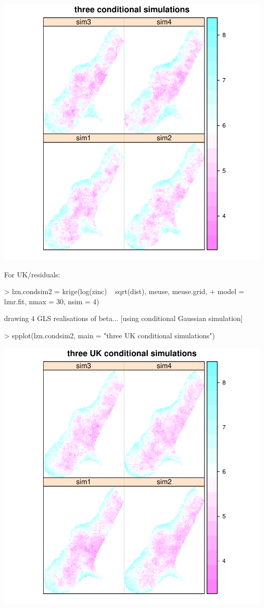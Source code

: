 \documentclass[a4paper]{article}
\begin{document}
\includegraphics{gstat-013}

For UK/residuals:

\begin{Schunk}
\begin{Sinput}
> lzn.condsim2 = krige(log(zinc) ~ sqrt(dist), meuse, meuse.grid, 
+     model = lznr.fit, nmax = 30, nsim = 4)
\end{Sinput}
\begin{Soutput}
drawing 4 GLS realisations of beta...
[using conditional Gaussian simulation]
\end{Soutput}
\begin{Sinput}
> spplot(lzn.condsim2, main = "three UK conditional simulations")
\end{Sinput}
\end{Schunk}

\includegraphics{gstat-015}
\end{document}
